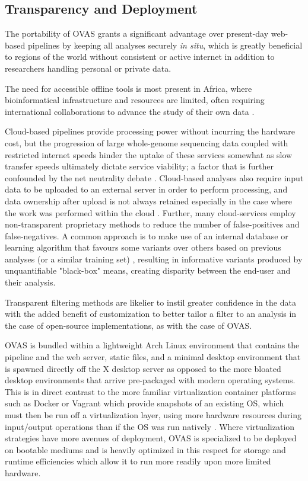 \documentclass[twocolumn]{bmcart}%
\def\app{OVAS}
\newcommand{\changes}[1]{{\color{red} #1}}
\begin{document}
\subsection{Transparency and Deployment}

The portability of \app{} grants a significant advantage over present-day web-based pipelines by keeping all analyses securely \textit{in situ}, which is greatly beneficial to regions of the world without consistent or active internet in addition to researchers handling personal or private data. 

\changes{The need for accessible offline tools is most present in Africa, where bioinformatical infrastructure and resources are limited, often requiring international collaborations to advance the study of their own data \cite{h3africa2014enabling}.}

\changes{Cloud-based pipelines provide processing power without incurring the hardware cost, but the progression of large whole-genome sequencing data coupled with restricted internet speeds hinder the uptake of these services somewhat as slow transfer speeds ultimately dictate service viability; a factor that is further confounded by the net neutrality debate \cite{netneutrality}.} Cloud-based analyses also require input data to be uploaded to an external server in order to perform processing, and data ownership after upload is not always retained especially in the case where the work was performed within the cloud \cite{reed2010information}. Further, many cloud-services employ non-transparent proprietary methods to reduce the number of false-positives and false-negatives. A common approach is to make use of an internal database or learning algorithm that favours some variants over others based on previous analyses (or a similar training set) \cite{pabinger2014survey}, resulting in informative variants produced by unquantifiable "black-box" means, creating disparity between the end-user and their analysis.

Transparent filtering methods are likelier to instil greater confidence in the data with the added benefit of customization to better tailor a filter to an analysis in the case of open-source implementations, as with the case of \app{}.


\changes{
\app{} is bundled within a lightweight Arch Linux environment that contains the pipeline and the web server, static files, and a minimal desktop environment that is spawned directly off the X desktop server as opposed to the more bloated desktop environments that arrive pre-packaged with modern operating systems. 
This is in direct contrast to the more familiar virtualization container platforms such as Docker or Vagrant which provide snapshots of an existing OS, which must then be run off a virtualization layer, using more hardware resources during input/output operations than if the OS was run natively \cite{virtualcomparison}. Where virtualization strategies have more avenues of deployment, \app{} is specialized to be deployed on bootable mediums and is heavily optimized in this respect for storage and runtime efficiencies which allow it to run more readily upon more limited hardware.
}
\end{document}
